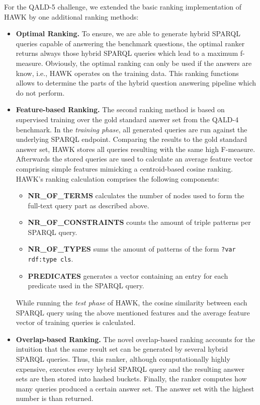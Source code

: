 For the QALD-5 challenge, we extended the basic ranking implementation of HAWK by one additional ranking methods:
\begin{itemize}
\item \textbf{Optimal Ranking.} To ensure, we are able to generate hybrid SPARQL queries capable of answering the benchmark questions, the optimal ranker returns always those hybrid SPARQL queries which lead to a maximum f-measure.  
    Obviously, the optimal ranking can only be used if the answers are know, i.e., HAWK operates on the training data.
    This ranking functions allows to determine the parts of the hybrid question answering pipeline which do not perform. 
\item \textbf{Feature-based Ranking.} The second ranking method is based on supervised training over the gold standard answer set from the QALD-4 benchmark.
    In the \emph{training phase}, all generated queries are run against the underlying SPARQL endpoint. 
    Comparing the results to the gold standard answer set, HAWK stores all queries resulting with the same high F-measure.
    Afterwards the stored queries are used to calculate an average feature vector comprising simple features mimicking a centroid-based cosine ranking.
    HAWK's ranking calculation comprises the following components:
    \begin{itemize}
    \item \textbf{NR\_OF\_TERMS} calculates the number of nodes used to form the full-text query part as described above.
    \item \textbf{NR\_OF\_CONSTRAINTS} counts the amount of triple patterns per SPARQL query.
    \item \textbf{NR\_OF\_TYPES} sums the amount of patterns of the form \texttt{?var rdf:type cls}.
    \item \textbf{PREDICATES} generates a vector containing an entry for each predicate used in the SPARQL query.
    \end{itemize}
    While running the \emph{test phase} of HAWK, the cosine similarity between each SPARQL query using the above mentioned features and the average feature vector of training queries is calculated.
\item \textbf{Overlap-based Ranking.} The novel overlap-based ranking accounts for the intuition that the same result set can be generated by several hybrid SPARQL queries. 
    Thus, this ranker, although computationally highly expensive, executes every hybrid SPARQL query and the resulting answer sets are then stored into hashed buckets. 
    Finally, the ranker computes how many queries produced a certain answer set. 
    The answer set with the highest number is than returned.
\end{itemize}
